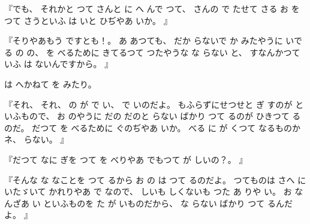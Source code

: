 
%
『でも、
%
それかと
つて
さんと
に
へ
んで
つて、
%
さんの
で
たせて
さる
お
を%
つて
さうといふ
は
いと
ひぢやあ
いか。
』

%
『そりやあもう
ですとも！。
%
あ
あつても、
%
だか
らないで
か
みたやうに
いでる
の
の、
%
を
べるために
きてるつて
つたやうな
な
らない
と、
%
すなんかつていふ
は
ないんですから。
』

%
は
へかねて
を
みたり。

%
『それ、
%
それ、
%
の
が
で
い、
%
で
いのだよ。
%
もふらずにせつせと
ぎ
すのが
といふもので、
%
お
のやうに
だの
だのと
らない
ばかり
つて
るのが
ひきつて
るのだ。
%
だつて
を
べるために
ぐのぢやあ
いか。
%
べる
に
が
くつて
なるものかネ、
%
らない。
』

%
『だつて
なに
ぎを
つて
を
べりやあ
でもつて
が
しいの？。
』

%
『そんな
な
なことを
つて
るから
お
の
は
つて
るのだよ。
%
つてものは
さへ
にいたゞいて
かれりやあ
で
なので、
%
しいも
しくないも
つた
あ
りや
い。
%
お
なんざあ
い
といふものを
た
が
いものだから、
%
な
らない
ばかり
つて
るんだよ。
』

